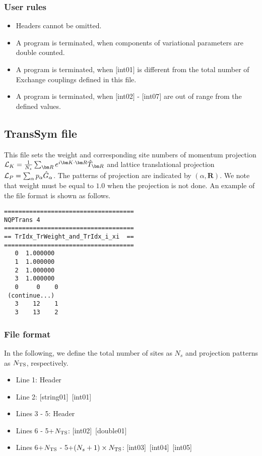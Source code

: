 \subsubsection{User rules}
\begin{itemize}
\item Headers cannot be omitted. 
\item A program is terminated, when components of variational parameters are double counted.
\item A program is terminated, when $[$int01$]$ is different from the total number of Exchange couplings defined in this file.
\item A program is terminated, when $[$int02$]$ - $[$int07$]$ are out of range from the defined values.
\end{itemize}

\newpage
\subsection{TransSym file}
\label{Subsec:TransSym}
This file sets the weight and corresponding site numbers of momentum projection
${\cal L}_K=\frac{1}{N_s}\sum_{{\bm R}}e^{i {\bm K} \cdot{\bm R} } \hat{T}_{\bm R}$
and lattice translational projection 
${\cal L}_P=\sum_{\alpha}p_{\alpha} \hat{G}_{\alpha}$. 
The patterns of projection are indicated by $(\alpha, {\bm R})$.
We note that weight must be equal to $1.0$ when the projection is not done.
An example of the file format is shown as follows.

\begin{minipage}{12.5cm}
\begin{screen}
\begin{verbatim}
====================================
NQPTrans 4  
====================================
== TrIdx_TrWeight_and_TrIdx_i_xi  ==
====================================
   0  1.000000
   1  1.000000
   2  1.000000
   3  1.000000
   0     0    0
 (continue...)
   3    12    1
   3    13    2 
\end{verbatim}
\end{screen}
\end{minipage}

\subsubsection{File format}
In the following, we define the total number of sites as $N_s$ and projection patterns as $N_{\rm TS}$, respectively.  

 \begin{itemize}
   \item  Line 1: Header
   \item  Line 2: [string01]~[int01]
   \item  Lines 3 - 5:  Header
   \item  Lines 6 - 5+$N_{\rm TS}$: [int02]~[double01]
   \item  Lines 6+$N_{\rm TS}$ - 5+$(N_s+1) \times N_{\rm TS}$: [int03]~[int04]~[int05]
  \end{itemize}
